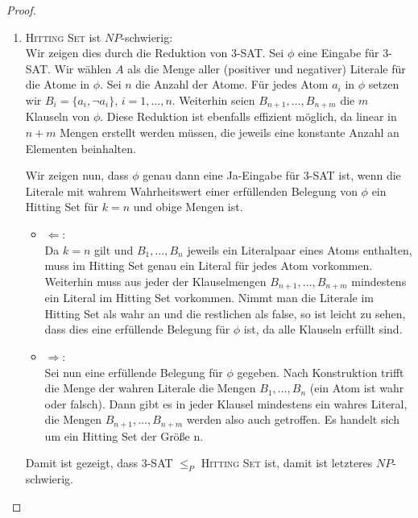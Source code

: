 \documentclass[a4paper]{scrartcl}
\begin{document}
\begin{enumerate}[label=\bfseries \arabic*.]
\begin{enumerate}
\begin{proof}
\begin{enumerate}
                \item \textsc{Hitting Set} ist $NP$-schwierig: \\
                    Wir zeigen dies durch die Reduktion von 3-SAT.
                    Sei $\phi$ eine Eingabe für 3-SAT. Wir wählen $A$ als die
                    Menge aller (positiver und negativer) Literale für die
                    Atome in $\phi$.
                    Sei $n$ die Anzahl der Atome. Für jedes Atom $a_i$ in
                    $\phi$ setzen wir $B_i = \{a_i, \lnot a_i\}$, $i = 1,
                    \dotsc, n$. Weiterhin seien $B_{n+1}, \dotsc, B_{n+m}$ die
                    $m$ Klauseln von $\phi$.
                    Diese Reduktion ist ebenfalls effizient möglich, da linear
                    in $n+m$ Mengen erstellt werden müssen, die jeweils eine
                    konstante Anzahl an Elementen beinhalten.

                    Wir zeigen nun, dass $\phi$ genau dann eine Ja-Eingabe für
                    3-SAT ist, wenn die Literale mit wahrem Wahrheitswert einer
                    erfüllenden Belegung von $\phi$ ein Hitting Set für $k = n$
                    und obige Mengen ist.
                    \begin{itemize}
                        \item $\Leftarrow$: \\
                            Da $k = n$ gilt und $B_1, \dotsc, B_n$ jeweils ein
                            Literalpaar eines Atoms enthalten, muss im Hitting
                            Set genau ein Literal für jedes Atom vorkommen.
                            Weiterhin muss aus jeder der Klauselmengen
                            $B_{n+1}, \dotsc, B_{n+m}$ mindestens ein Literal
                            im Hitting Set vorkommen. Nimmt man die Literale im
                            Hitting Set als wahr an und die restlichen als
                            false, so ist leicht zu sehen, dass dies eine
                            erfüllende Belegung für $\phi$ ist, da alle
                            Klauseln erfüllt sind.

                        \item $\Rightarrow$: \\
                            Sei nun eine erfüllende Belegung für $\phi$
                            gegeben. Nach Konstruktion trifft die Menge der
                            wahren Literale die Mengen $B_1, \dotsc, B_n$ (ein
                            Atom ist wahr oder falsch). Dann gibt es in jeder
                            Klausel mindestens ein wahres Literal, die Mengen
                            $B_{n+1}, \dotsc, B_{n+m}$ werden also auch
                            getroffen. Es handelt sich um ein Hitting Set der
                            Größe n.
                    \end{itemize}
                    Damit ist gezeigt, dass 3-SAT $\leq_P$ \textsc{Hitting Set}
                    ist, damit ist letzteres $NP$-schwierig.


\end{enumerate}
\end{proof}
\end{enumerate}
\end{enumerate}
\end{document}
